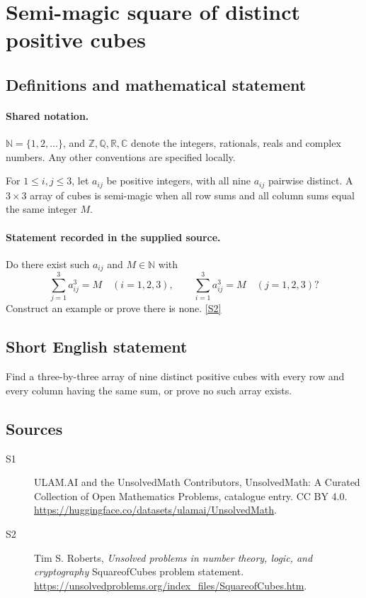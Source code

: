 \documentclass[11pt]{article}
\newcommand{\sref}[2]{\hyperlink{source:#1:#2}{[S#2]}}
\begin{document}
\section{Semi-magic square of distinct positive cubes}\label{statement}

\subsection{Definitions and mathematical statement}

\paragraph{Shared notation.}$\mathbb N=\{1,2,\ldots\}$, and $\mathbb Z,\mathbb Q,\mathbb R,\mathbb C$ denote the integers, rationals, reals and complex numbers. Any other conventions are specified locally.


For $1\le i,j\le3$, let $a_{ij}$ be positive integers, with all nine $a_{ij}$ pairwise distinct. A $3\times3$ array of cubes is semi-magic when all row sums and all column sums equal the same integer $M$.
\paragraph{Statement recorded in the supplied source.}
Do there exist such $a_{ij}$ and $M\in\mathbb N$ with
\[
\sum_{j=1}^{3}a_{ij}^{3}=M\quad(i=1,2,3),\qquad
\sum_{i=1}^{3}a_{ij}^{3}=M\quad(j=1,2,3)?
\]
Construct an example or prove there is none. \sref{statement}{2}
\subsection{Short English statement}
Find a three-by-three array of nine distinct positive cubes with every row and every column having the same sum, or prove no such array exists.
\subsection{Sources}
\begin{description}
\item[\hypertarget{source:statement:1}{S1}] ULAM.AI and the UnsolvedMath Contributors, UnsolvedMath: A Curated Collection of Open Mathematics Problems, catalogue entry. CC BY 4.0. \url{https://huggingface.co/datasets/ulamai/UnsolvedMath}.
\item[\hypertarget{source:statement:2}{S2}] Tim S. Roberts, \emph{Unsolved problems in number theory, logic, and cryptography} SquareofCubes problem statement. \url{https://unsolvedproblems.org/index_files/SquareofCubes.htm}.
\end{description}
\label{end:statement}
\end{document}
